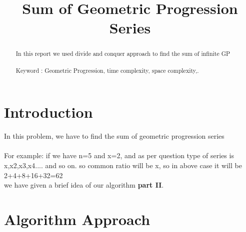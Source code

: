 \documentclass[conference]{IEEEtran}
\begin{document}
\title{
Sum of Geometric Progression Series \\
}

\author{
\and
{}
\and
{}
}

\maketitle

\noindent \begin{abstract}

In this report we used divide and conquer approach to find the sum of infinite GP \\\\
Keyword : Geometric Progression, time complexity, space complexity,.

\end{abstract}


\section{\textbf{Introduction}}
\noindent In this problem, we have to find the sum of geometric progression series \\\\

\noindent For example: if we have n=5 and x=2, and as per question type of series is x,x2,x3,x4.... and so on. so common ratio will be x, so in above case it will be 2+4+8+16+32=62\\

\noindent we have given a brief idea of our algorithm \textbf{part II}.\\


\section{\textbf {Algorithm Approach}}
\end{document}
